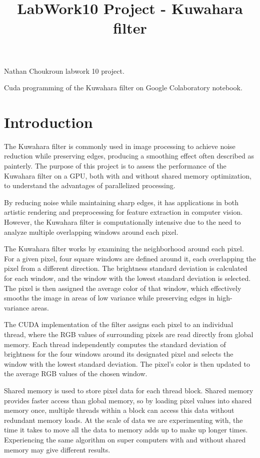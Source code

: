 \documentclass{article}
\title{ LabWork10 Project - Kuwahara filter}
\date{}
\begin{document}
\maketitle

Nathan Choukroun labwork 10 project. 

Cuda programming of the Kuwahara filter on Google Colaboratory notebook. 

\section{Introduction}

The Kuwahara filter is commonly used in image processing to achieve noise reduction while preserving edges, producing a smoothing effect often described as painterly. The purpose of this project is to assess the performance of the Kuwahara filter on a GPU, both with and without shared memory optimization, to understand the advantages of parallelized processing. 

By reducing noise while maintaining sharp edges, it has applications in both artistic rendering and preprocessing for feature extraction in computer vision. However, the Kuwahara filter is computationally intensive due to the need to analyze multiple overlapping windows around each pixel.

The Kuwahara filter works by examining the neighborhood around each pixel. For a given pixel, four square windows are defined around it, each overlapping the pixel from a different direction. The brightness standard deviation is calculated for each window, and the window with the lowest standard deviation is selected. The pixel is then assigned the average color of that window, which effectively smooths the image in areas of low variance while preserving edges in high-variance areas.

The CUDA implementation of the filter assigns each pixel to an individual thread, where the RGB values of surrounding pixels are read directly from global memory. Each thread independently computes the standard deviation of brightness for the four windows around its designated pixel and selects the window with the lowest standard deviation. The pixel's color is then updated to the average RGB values of the chosen window. 

Shared memory is used to store pixel data for each thread block. Shared memory provides faster access than global memory, so by loading pixel values into shared memory once, multiple threads within a block can access this data without redundant memory loads. At the scale of data we are experimenting with, the time it takes to move all the data to memory adds up to make up longer times. Experiencing the same algorithm on super computers with and without shared memory may give different results. 
\end{document}
